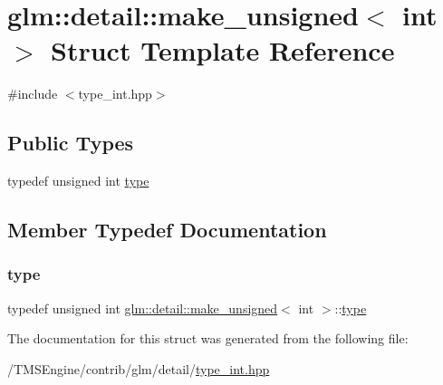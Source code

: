 \hypertarget{structglm_1_1detail_1_1make__unsigned_3_01int_01_4}{}\section{glm\+:\+:detail\+:\+:make\+\_\+unsigned$<$ int $>$ Struct Template Reference}
\label{structglm_1_1detail_1_1make__unsigned_3_01int_01_4}


{\ttfamily \#include $<$type\+\_\+int.\+hpp$>$}

\subsection*{Public Types}
\begin{DoxyCompactItemize}
\item 
typedef unsigned int \hyperlink{structglm_1_1detail_1_1make__unsigned_3_01int_01_4_ac3fd57ed35c0305bbe941009a84139c1}{type}
\end{DoxyCompactItemize}


\subsection{Member Typedef Documentation}
\mbox{\label{structglm_1_1detail_1_1make__unsigned_3_01int_01_4_ac3fd57ed35c0305bbe941009a84139c1}} 
\subsubsection{\texorpdfstring{type}{type}}
{\footnotesize\ttfamily typedef unsigned int \hyperlink{structglm_1_1detail_1_1make__unsigned}{glm\+::detail\+::make\+\_\+unsigned}$<$ int $>$\+::\hyperlink{structglm_1_1detail_1_1make__unsigned_3_01int_01_4_ac3fd57ed35c0305bbe941009a84139c1}{type}}



The documentation for this struct was generated from the following file\+:\begin{DoxyCompactItemize}
\item 
/\+T\+M\+S\+Engine/contrib/glm/detail/\hyperlink{type__int_8hpp}{type\+\_\+int.\+hpp}\end{DoxyCompactItemize}
